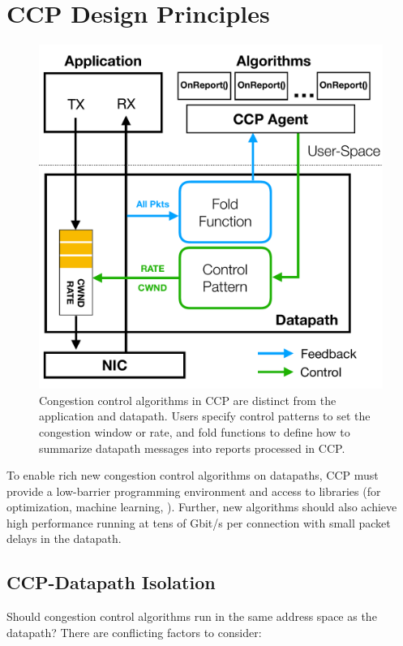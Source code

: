 \section{CCP Design Principles}
\label{s:design}
%
\begin{figure}[t]
\centering
    \includegraphics[width=\columnwidth]{img/ccp_design_sigcomm}
    \caption{Congestion control algorithms in CCP are distinct from the application and datapath.
    Users specify control patterns to set the congestion window or rate,
    and fold functions to define how to summarize datapath messages into reports processed in CCP.}\label{fig:design}
\end{figure}
%

To enable rich new congestion control algorithms on datapaths,
CCP must provide a low-barrier programming environment and access
to libraries (\eg for optimization, machine learning, \etc).
%
Further, new algorithms should also achieve high performance running at tens of
Gbit/s per connection with small packet delays in the datapath.

\subsection{CCP-Datapath Isolation}
\label{s:datapath:isolation}
Should congestion control algorithms run in the same address space as the
datapath? There are conflicting factors to consider:

